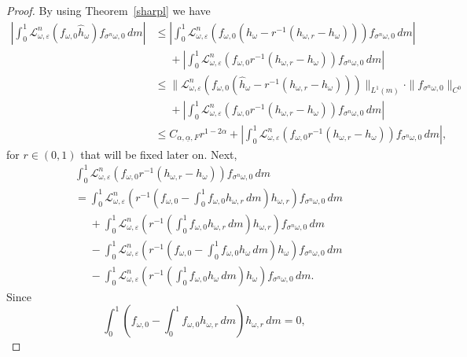 \documentclass[10pt,a4paper]{amsart}
\begin{document}
\begin{proof}
	By using Theorem~\ref{sharpl} we have
	\begin{equation}\label{gh1}
		\begin{split}
			\left |\int_0^1 \mathcal L_{\omega, \varepsilon}^n (f_{\omega, 0}\hat h_\omega)f_{\sigma^n \omega, 0}\, dm\right | &\le \left |\int_0^1 \mathcal L_{\omega, \varepsilon}^n (f_{\omega, 0}(\hat h_\omega-r^{-1}(h_{\omega, r}-h_\omega)))
			f_{\sigma^n \omega, 0}\, dm\right | \\
			&\phantom{\le}+\left |\int_0^1 \mathcal L_{\omega, \varepsilon}^n (f_{\omega, 0}r^{-1}(h_{\omega, r}-h_\omega))f_{\sigma^n \omega, 0}\, dm\right | \\
			&\le \|\mathcal L_{\omega, \varepsilon}^n (f_{\omega, 0}(\hat h_\omega-r^{-1}(h_{\omega, r}-h_\omega)))\|_{L^1(m)} \cdot \|f_{\sigma^n \omega, 0}\|_{C^0}\\
			&\phantom{\le}+\left |\int_0^1 \mathcal L_{\omega, \varepsilon}^n (f_{\omega, 0}r^{-1}(h_{\omega, r}-h_\omega))f_{\sigma^n \omega, 0}\, dm\right |\\
			&\le C_{\alpha, \underline{\alpha}, F}r^{1-2\alpha}+ \left |\int_0^1 \mathcal L_{\omega, \varepsilon}^n (f_{\omega, 0}r^{-1}(h_{\omega, r}-h_\omega))f_{\sigma^n \omega, 0}\, dm\right |,
		\end{split}
	\end{equation}
	for $r\in (0, 1)$ that will be fixed later on.
	Next,
	\[
	\begin{split}
		& \int_0^1 \mathcal L_{\omega, \varepsilon}^n (f_{\omega, 0}r^{-1}(h_{\omega, r}-h_\omega))f_{\sigma^n \omega, 0}\, dm \\
		&=\int_0^1 \mathcal L_{\omega, \varepsilon}^n \left (r^{-1}\left (f_{\omega, 0}-\int_0^1f_{\omega, 0}h_{\omega, r}\, dm\right )h_{\omega, r}\right )f_{\sigma^n \omega, 0}\, dm \\
		&\phantom{=}+\int_0^1 \mathcal L_{\omega, \varepsilon}^n \left (r^{-1}\left (\int_0^1 f_{\omega, 0}h_{\omega, r}\, dm\right )h_{\omega, r}\right )f_{\sigma^n \omega, 0}\, dm \\
		&\phantom{=}-\int_0^1 \mathcal L_{\omega, \varepsilon}^n \left(r^{-1} \left (f_{\omega, 0}-\int_0^1 f_{\omega, 0}h_\omega\, dm\right )h_\omega \right )f_{\sigma^n \omega, 0}\, dm \\
		&\phantom{=}-\int_0^1 \mathcal L_{\omega, \varepsilon}^n \left (r^{-1} \left (\int_0^1 f_{\omega, 0}h_\omega\, dm\right )h_\omega \right )f_{\sigma^n \omega, 0}\, dm.
	\end{split}
	\]
	Since 
	\[
	\int_0^1 \left (f_{\omega, 0}-\int_0^1f_{\omega, 0}h_{\omega, r}\, dm\right )h_{\omega, r}\, dm=0,
\]
\end{proof}
\end{document}
